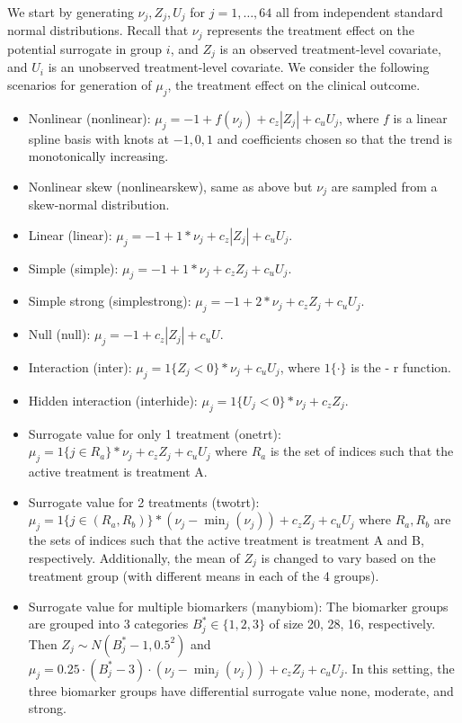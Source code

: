 \documentclass[
]{article}
\providecommand{\tightlist}{%
  \setlength{\itemsep}{0pt}\setlength{\parskip}{0pt}}
\begin{document}
We start by generating \(\nu_j, Z_j, U_j\) for \(j = 1, \ldots, 64\) all
from independent standard normal distributions. Recall that \(\nu_j\)
represents the treatment effect on the potential surrogate in group
\(i\), and \(Z_j\) is an observed treatment-level covariate, and \(U_i\)
is an unobserved treatment-level covariate. We consider the following
scenarios for generation of \(\mu_j\), the treatment effect on the
clinical outcome.

\begin{itemize}
\tightlist
\item
  Nonlinear (nonlinear):
  \(\mu_j = -1 + f(\nu_j) + c_z |Z_j| + c_u U_j\), where \(f\) is a
  linear spline basis with knots at \(-1, 0, 1\) and coefficients chosen
  so that the trend is monotonically increasing.
\item
  Nonlinear skew (nonlinearskew), same as above but \(\nu_j\) are
  sampled from a skew-normal distribution.
\item
  Linear (linear): \(\mu_j = -1 + 1* \nu_j + c_z |Z_j| + c_u U_j\).
\item
  Simple (simple): \(\mu_j = -1 + 1* \nu_j + c_z Z_j + c_u U_j\).
\item
  Simple strong (simplestrong):
  \(\mu_j = -1 + 2* \nu_j + c_z Z_j + c_u U_j\).
\item
  Null (null): \(\mu_j = -1 + c_z |Z_j| + c_u U\).
\item
  Interaction (inter): \(\mu_j = 1\{Z_j < 0\} * \nu_j + c_u U_j\), where
  \(1\{\cdot\}\) is the - r function.
\item
  Hidden interaction (interhide):
  \(\mu_j = 1\{U_j < 0\} * \nu_j + c_z Z_j\).
\item
  Surrogate value for only 1 treatment (onetrt):
  \(\mu_j = 1\{j\in R_a\} * \nu_j + c_z Z_j + c_u U_j\) where \(R_a\) is
  the set of indices such that the active treatment is treatment A.
\item
  Surrogate value for 2 treatments (twotrt):
  \(\mu_j = 1\{j\in (R_a, R_b)\} * (\nu_j - \min_j(\nu_j)) + c_z Z_j + c_u U_j\)
  where \(R_a, R_b\) are the sets of indices such that the active
  treatment is treatment A and B, respectively. Additionally, the mean
  of \(Z_j\) is changed to vary based on the treatment group (with
  different means in each of the 4 groups).
\item
  Surrogate value for multiple biomarkers (manybiom): The biomarker
  groups are grouped into 3 categories \(B^*_j \in \{1, 2, 3\}\) of size
  20, 28, 16, respectively. Then \(Z_j \sim N(B^*_j - 1, 0.5^2)\) and
  \(\mu_j = 0.25 \cdot (B^*_j - 3) \cdot (\nu_j - \min_j(\nu_j)) + c_z Z_j + c_u U_j\).
  In this setting, the three biomarker groups have differential
  surrogate value none, moderate, and strong.
\end{itemize}
\end{document}

